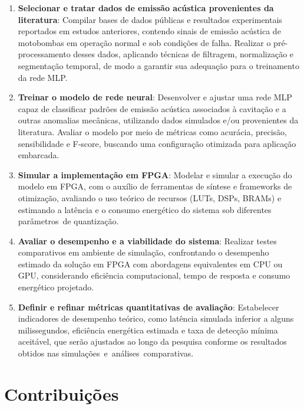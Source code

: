 \begin{enumerate}[label=\textbf{\arabic*.}]
    \item \textbf{Selecionar e tratar dados de emissão acústica provenientes da literatura}:
Compilar bases de dados públicas e resultados experimentais reportados em estudos anteriores, contendo sinais de emissão acústica de motobombas em operação normal e sob condições de falha. Realizar o pré-processamento desses dados, aplicando técnicas de filtragem, normalização e segmentação temporal, de modo a garantir sua adequação para o treinamento da rede MLP.

    \item \textbf{Treinar o modelo de rede neural}:
Desenvolver e ajustar uma rede MLP capaz de classificar padrões de emissão acústica associados à cavitação e a outras anomalias mecânicas, utilizando dados simulados e/ou provenientes da literatura. Avaliar o modelo por meio de métricas como acurácia, precisão, sensibilidade e F-score, buscando uma configuração otimizada para aplicação embarcada.

    \item \textbf{Simular a implementação em FPGA}:
Modelar e simular a execução do modelo em FPGA, com o auxílio de ferramentas de síntese e frameworks de otimização, avaliando o uso teórico de recursos (LUTs, DSPs, BRAMs) e estimando a latência e o consumo energético do sistema sob diferentes parâmetros~de quantização.

    \item \textbf{Avaliar o desempenho e a viabilidade do sistema}:
Realizar testes comparativos em ambiente de simulação, confrontando o desempenho estimado da solução em FPGA com abordagens equivalentes em CPU ou GPU, considerando eficiência computacional, tempo de resposta e consumo energético projetado.

    \item \textbf{Definir e refinar métricas quantitativas de avaliação}:
Estabelecer indicadores de desempenho teórico, como latência simulada inferior a alguns milissegundos, eficiência energética estimada e taxa de detecção mínima aceitável, que serão ajustados ao longo da pesquisa conforme os resultados obtidos nas \mbox{simulações e análises comparativas.}
\end{enumerate}

\section{Contribuições}

